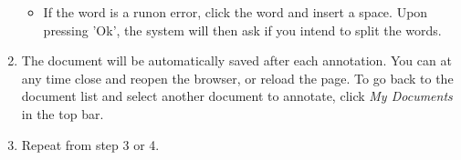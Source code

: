 \documentclass[a4paper,11pt]{article}
\begin{document}
\begin{enumerate}
\begin{itemize}
\begin{center}
  \end{center}
  \item If the word is a runon error, click the word and insert a space. Upon
    pressing 'Ok', the
    system will then ask if you intend to split the words.
\end{itemize}
\item The document will be automatically saved after each annotation. You can
  at any time close and reopen the browser, or reload the page. To go back to
  the document list and select another document to annotate, click \emph{My
  Documents} in the top bar.
\item Repeat from step 3 or 4.
\end{enumerate}


\end{document}
